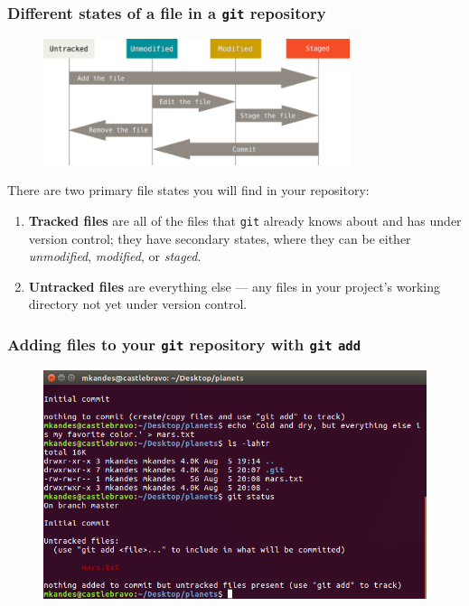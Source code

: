 \documentclass{beamer}
\begin{document}
\begin{frame}
   \frametitle{Different states of a file in a \texttt{git} repository}
   \begin{figure}[htbp]
      \includegraphics[width=0.8\textwidth]{images/git-file-lifecycle.png}
   \end{figure}
   There are two primary file states you will find in your repository: \\
   \begin{enumerate}
      \setlength\itemsep{0.5em}
      \item \textbf{Tracked files} are all of the files that 
         \texttt{git} already knows about and has under version control; 
         they have secondary states, where they can be either 
         \textit{unmodified}, \textit{modified}, or \textit{staged}. 
      \item \textbf{Untracked files} are everything else --- any files 
         in your project's working directory not yet under version 
         control.
   \end{enumerate}
\end{frame}

\begin{frame}
   \frametitle{Adding files to your \texttt{git} repository with \texttt{git} \texttt{add}}
   \begin{figure}[htbp]
      \includegraphics[width=1.0\textwidth]{images/git-untracked-file.png}
   \end{figure}
\end{frame}
\end{document}
